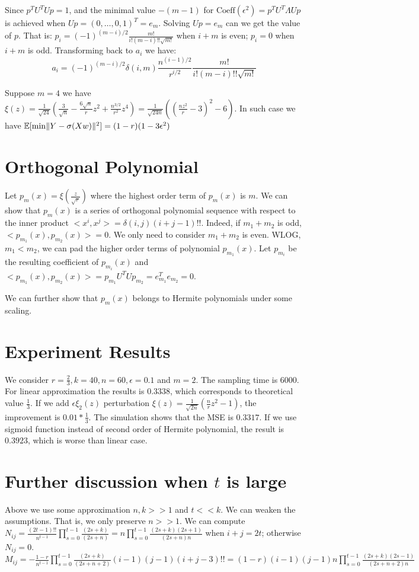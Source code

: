 \documentclass{article}
\DeclarePairedDelimiter\norm{\lVert}{\rVert}
\def\E{\mathbb{E}}
\begin{document}
Since $p^T U^T U p = 1$, and the minimal value $-(m-1)$ for
$\textrm{Coeff}(\epsilon^2) = p^T U^T \Lambda U p $ is achieved
when $U p = (0, \dots, 0, 1)^T = e_m$.
Solving $ U p = e_m $ can we get the value of $p$.
That is: $p_i = (-1)^{(m-i)/2} \frac{m!}{i!(m-i)!! \sqrt{m!}} $
when $i+m$ is even; $p_i = 0 $ when $i+m$ is odd.
Transforming back to $a_i$ we have:
\begin{equation}
a_i =(-1)^{(m-i)/2} \delta(i,m) \frac{n^{(i-1)/2}}{r^{i/2}}
\frac{m!}{i!(m-i)!! \sqrt{m!}}
\end{equation}

Suppose  $ m = 4$ we have $ \xi(z) =
\frac{1}{\sqrt{24}}(\frac{3}{\sqrt{n}} - \frac{6\sqrt{n}}{r} z^2 +
\frac{n^{3/2}}{r^2}z^4)  = \frac{1}{\sqrt{24n}}((\frac{nz^2}{r} - 3)^2 - 6)$.
In such case we have $\E[\min \norm{Y - \sigma(Xw)}^2]=(1-r)(1-3\epsilon^2)$
\section{Orthogonal Polynomial}
Let $p_m(x) = \xi(\frac{z}{\sqrt{r}})$
where the highest order term of $p_m(x)$ is $m$.
We can show that $p_m(x)$ is a series of orthogonal polynomial sequence
with respect to the inner product
$<x^i, x^j> = \delta(i,j)(i+j-1)!!$.
Indeed, if $m_1 + m_2$ is odd, $<p_{m_1}(x), p_{m_2}(x)> = 0$.
We only need to consider $m_1 + m_2$ is even. WLOG, $m_1 < m_2$,
we can pad the higher order terms of polynomial $p_{m_1}(x)$.
Let $p_{m_i}$ be the resulting coefficient of $p_{m_i}(x)$
and $<p_{m_1}(x), p_{m_2}(x)> = p_{m_1}U^TUp_{m_2} = e^T_{m_1} e_{m_2} = 0$.

We can further show that $p_m(x)$ belongs to Hermite polynomials
under some scaling.

\section{Experiment Results}
We consider $r=\frac{2}{3}, k=40, n=60, \epsilon=0.1$ and $m=2$.
The sampling time is 6000.
For linear approximation the results is $0.3338$,
which corresponds to theoretical value $\frac{1}{3}$.
If we add $\epsilon \xi_2(z)$ perturbation
$\xi(z) = \frac{1}{\sqrt{2n}}(\frac{n}{r} z^2 -1)$,
the improvement is $0.01 * \frac{1}{3}$.
The simulation shows that the MSE is $0.3317$.
If we use sigmoid function instead of second order of Hermite polynomial,
the result is $0.3923$, which is worse than linear case.

\section{Further discussion when $t$ is large}
Above we use some approximation $n, k >> 1$ and $ t << k$.
We can weaken the assumptions. That is, we only preserve $ n >> 1$.
We can compute $N_{ij} =\frac{(2t-1)!!}{n^{t-1}} \prod_{s=0}^{t-1}
\frac{(2s+k)}{(2s+n)} = n
\prod_{s=0}^{t-1} \frac{(2s+k)(2s+1)}{(2s+n)n}$ 
when $i+j = 2t$; otherwise $N_{ij}=0$.
$M_{ij}=-\frac{1-r}{n^{t-1}} \prod_{s=0}^{t-1}
\frac{(2s+k)}{(2s+n+2)} (i-1)(j-1) (i+j-3)!! =
(1-r)(i-1)(j-1)n \prod_{s=0}^{t-1} \frac{(2s+k)(2s-1)}{(2s+n+2)n}$
\end{document}
